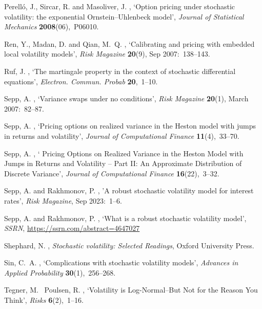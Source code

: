 \documentclass[11pt,a4paper] {article}
\begin{document}
\begin{thebibliography}{}
Perell{\'o}, J., Sircar, R. and Masoliver, J.  \harvardyearright , `Option pricing under stochastic volatility: the
  exponential Ornstein--Uhlenbeck model', {\em Journal of Statistical
  Mechanics} {\bf 2008}(06),~P06010.
	
Ren, Y., Madan, D. and Qian, M.~Q.  \harvardyearright , `Calibrating and pricing with embedded local volatility models', {\em Risk Magazine} {\bf 20}(9), Sep 2007:~138--143.
  
Ruf, J.  \harvardyearright , `The martingale property in the context of stochastic differential equations', {\em Electron. Commun. Probab} {\bf 20},~1--10.

Sepp, A.  \harvardyearright , `Variance swaps under no conditions', {\em Risk Magazine} {\bf 20}(1), March 2007:~82--87.

Sepp, A.  \harvardyearright , `Pricing options on realized
  variance in the Heston model with jumps in returns and volatility', {\em
  Journal of Computational Finance} {\bf 11}(4),~33--70.


Sepp, A.  \harvardyearright , `
Pricing Options on Realized Variance in the Heston Model with Jumps in Returns and Volatility -- Part II: An Approximate Distribution of Discrete Variance', {\em
  Journal of Computational Finance} {\bf 16}(22),~3--32.
	
	
 Sepp, A. and Rakhmonov, P. \harvardyearright, 'A robust stochastic volatility model for interest rates', {\em Risk Magazine}, Sep 2023:~1--6.

 Sepp, A. and Rakhmonov, P. \harvardyearright, `What is a robust stochastic volatility model', {\em SSRN}, \url{https://ssrn.com/abstract=4647027}
	
	
Shephard, N.  \harvardyearright , {\em Stochastic
  volatility: Selected Readings}, Oxford University Press.

Sin, C.~A.  \harvardyearright , `Complications with
  stochastic volatility models', {\em Advances in Applied Probability} {\bf
  30}(1),~256--268.
 

Tegner, M. \harvardand\ Poulsen, R. \harvardyearright, `Volatility is Log-Normal--But Not for the Reason You Think',  {\em Risks} {\bf 6}(2),~1--16.


\end{thebibliography}
\end{document}
